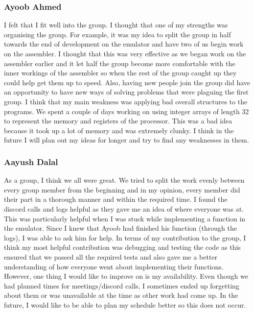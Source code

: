 \documentclass[11pt]{article}
\begin{document}
\subsubsection{Ayoob Ahmed}
I felt that I fit well into the group. I thought that one of my strengths was organising the group. For example, it was my idea to split the group in half towards the end of development on the emulator and have two of us begin work on the assembler. I thought that this was very effective as we began work on the assembler earlier and it let half the group become more comfortable with the inner workings of the assembler so when the rest of the group caught up they could help get them up to speed. Also, having new people join the group did have an opportunity to have new ways of solving problems that were plaguing the first group. I think that my main weakness was applying bad overall structures to the programs. We spent a couple of days working on using integer arrays of length 32 to represent the memory and registers of the processor. This was a bad idea because it took up a lot of memory and was extremely clunky. I think in the future I will plan out my ideas for longer and try to find any weaknesses in them.
\subsubsection{Aayush Dalal}
As a group, I think we all were great. We tried to split the work evenly between every group member from the beginning and in my opinion, every member did their part in a thorough manner and within the required time. I found the discord calls and logs helpful as they gave me an idea of where everyone was at. This was particularly helpful when I was stuck while implementing a function in the emulator. Since I knew that Ayoob had finished his function (through the logs), I was able to ask him for help. In terms of my contribution to the group, I think my most helpful contribution was debugging and testing the code as this ensured that we passed all the required tests and also gave me a better understanding of how everyone went about implementing their functions. However, one thing I would like to improve on is my availability. Even though we had planned times for meetings/discord calls, I sometimes ended up forgetting about them or was unavailable at the time as other work had come up. In the future, I would like to be able to plan my schedule better so this does not occur.
\end{document}
